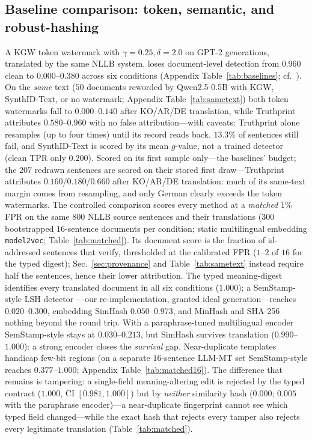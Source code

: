 \documentclass[11pt]{article}
\begin{document}
\subsection{Baseline comparison: token, semantic, and robust-hashing}
\label{sec:baselines}\label{sec:matched}
A KGW token watermark with $\gamma{=}0.25,\delta{=}2.0$ \cite{kirchenbauer2023kgw} on GPT-2 generations, translated by the same NLLB system, loses document-level detection from $0.960$ clean to $0.000$--$0.380$ across six conditions (Appendix Table~\ref{tab:baselines}; cf.\ \cite{he2024crosslingual}). On the \emph{same} text ($50$ documents reworded by Qwen2.5-0.5B with KGW, SynthID-Text, or no watermark; Appendix Table~\ref{tab:sametext}) both token watermarks fall to $0.000$--$0.140$ after KO/AR/DE translation, while Truthprint attributes $0.580$--$0.960$ with no false attribution---with caveats: Truthprint alone resamples (up to four times) until its record reads back, $13.3\%$ of sentences still fail, and SynthID-Text is scored by its mean $g$-value, not a trained detector (clean TPR only $0.200$). Scored on its first sample only---the baselines' budget; the $207$ redrawn sentences are scored on their stored first draw---Truthprint attributes $0.160$/$0.180$/$0.660$ after KO/AR/DE translation: much of its same-text margin comes from resampling, and only German clearly exceeds the token watermarks. The controlled comparison scores every method at a \emph{matched} $1\%$ FPR on the same $800$ NLLB source sentences and their translations ($300$ bootstrapped $16$-sentence documents per condition; static multilingual embedding \texttt{model2vec}; Table~\ref{tab:matched}). Its document score is the fraction of id-addressed sentences that verify, thresholded at the calibrated FPR ($1$--$2$ of $16$ for the typed digest); Sec.~\ref{sec:provenance} and Table~\ref{tab:sametext} instead require half the sentences, hence their lower attribution. The typed meaning-digest identifies every translated document in all six conditions ($1.000$); a SemStamp-style LSH detector \cite{hou2024semstamp}---our re-implementation, granted ideal generation---reaches $0.020$--$0.300$, embedding SimHash \cite{charikar2002simhash} $0.050$--$0.973$, and MinHash \cite{broder1997minhash} and SHA-256 nothing beyond the round trip. With a paraphrase-tuned multilingual encoder \cite{reimers2020multilingual} SemStamp-style stays at $0.030$--$0.213$, but SimHash survives translation ($0.990$--$1.000$): a strong encoder closes the \emph{survival} gap. Near-duplicate templates handicap few-bit regions (on a separate $16$-sentence LLM-MT set SemStamp-style reaches $0.377$--$1.000$; Appendix Table~\ref{tab:matched16}). The difference that remains is tampering: a single-field meaning-altering edit is rejected by the typed contract ($1.000$, CI $[0.981,1.000]$) but by \emph{neither} similarity hash ($0.000$; $0.005$ with the paraphrase encoder)---a near-duplicate fingerprint cannot see which typed field changed---while the exact hash that rejects every tamper also rejects every legitimate translation (Table~\ref{tab:matched}).
\end{document}
